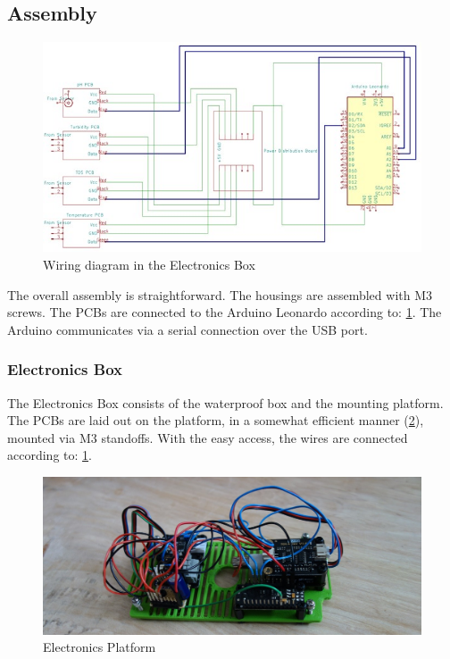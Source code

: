 \documentclass[
  english,
  man,floatsintext]{apa6}
\begin{document}
\newpage

\hypertarget{assembly}{%
\subsection{Assembly}\label{assembly}}

\begin{figure}[H]
\includegraphics[width=\textwidth,]{sup/wiring} \caption{Wiring diagram in the Electronics Box}\label{fig:wiring}
\end{figure}



The overall assembly is straightforward. The housings are assembled with M3 screws. The PCBs are connected to the Arduino Leonardo according to: \ref{fig:wiring}. The Arduino communicates via a serial connection over the USB port.

\hypertarget{electronics-box}{%
\subsubsection{Electronics Box}\label{electronics-box}}

The Electronics Box consists of the waterproof box and the mounting platform. The PCBs are laid out on the platform, in a somewhat efficient manner (\ref{fig:platform-photo}), mounted via M3 standoffs. With the easy access, the wires are connected according to: \ref{fig:wiring}.

\begin{figure}[H]
\includegraphics[width=\textwidth,]{sup/platform_photo} \caption{Electronics Platform}\label{fig:platform-photo}
\end{figure}
\end{document}
